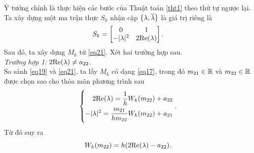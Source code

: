 \begin{cm}
Ý tưởng chính là thực hiện các bước của Thuật toán \ref{tht1} theo thứ tự ngược lại.\\
Ta xây dựng một ma trận thực $S_k$ nhận cặp  $\{ \lambda, \overline{\lambda}\}$ là giá trị riêng là
\begin{equation}\label{eq21}
	S_k = \begin{bmatrix}
		0 &1\\
		-\vert \lambda \vert ^2 & 2 \mathrm{Re}(\lambda)
	\end{bmatrix}.
\end{equation}
Sau đó, ta xây dựng $M_k$ từ \eqref{eq21}. Xét hai trường hợp sau.\\
\noindent\textit{Trường hợp 1:} $2\mathrm{Re}(\lambda) \ne a_{22}$.\\
So sánh \eqref{eq19} và \eqref{eq21}, ta lấy $M_k$ có dạng \eqref{eq17}, trong đó $m_{21} \in \mathbb{R}$ và $m_{22} \in \mathbb{R}$ được chọn sao cho thỏa mãn phương trình sau
\begin{equation*}
	\left\{\begin{aligned}2\mathrm{Re}(\lambda) = \dfrac{1}{h } W_k(m_{22}) +a_{22} \\ -\vert \lambda\vert ^2 = \dfrac{m_{21}}{h  m_{22}} W_k(m_{22}) + a_{21}\end{aligned}\right..
\end{equation*}
Từ đó suy ra
\begin{equation}\label{eq22}
	W_k(m_{22}) = h (2\mathrm{Re}(\lambda) - a_{22}).
\end{equation}


\end{cm}
